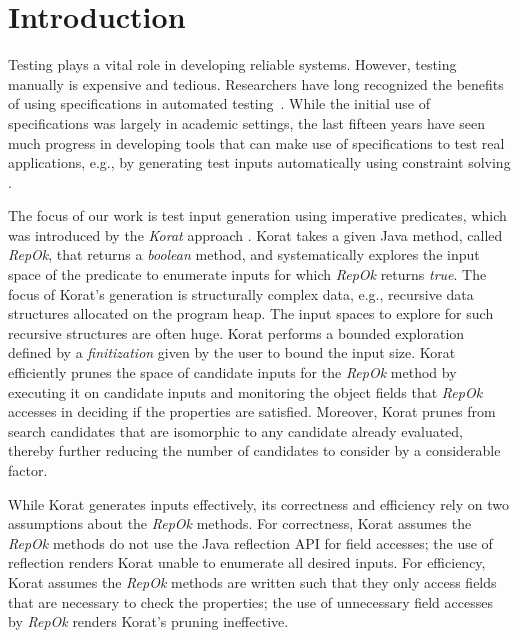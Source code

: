 \chapter{Introduction}
\label{ch:introduction}
Testing plays a vital role in developing reliable systems. However,
testing manually is expensive and tedious. Researchers have long
recognized the benefits of using specifications in automated
testing~\cite{boyapati2002korat,demilli1991constraint,gotlieb1998automatic,howden1977symbolic,huang1975approach,king1976symbolic,korel1996automated,marinov2001testera,khurshid2003generalized,sen2005cute,godefroid2005dart}. While
the initial use of specifications was largely in academic settings,
the last fifteen years have seen much progress in developing tools
that can make use of specifications to test real applications, e.g.,
by generating test inputs automatically using constraint solving
\cite{demilli1991constraint,gotlieb1998automatic,howden1977symbolic,huang1975approach,king1976symbolic,korel1996automated,legeard2002automated,marinov2001testera}.

\para The focus of our work is test input generation using imperative
predicates, which was introduced by the \emph{Korat} approach
\cite{boyapati2002korat}. Korat takes a given Java method, called
\emph{RepOk}, that returns a \emph{boolean} method, and systematically
explores the input space of the predicate to enumerate inputs for
which \emph{RepOk} returns \emph{true}. The focus of Korat’s
generation is structurally complex data, e.g., recursive data
structures allocated on the program heap. The input spaces to explore
for such recursive structures are often huge.  Korat performs a
bounded exploration defined by a \emph{finitization} given by the user
to bound the input size. Korat efficiently prunes the space of
candidate inputs for the \emph{RepOk} method by executing it on
candidate inputs and monitoring the object fields that \emph{RepOk}
accesses in deciding if the properties are satisfied. Moreover, Korat
prunes from search candidates that are isomorphic to any candidate
already evaluated, thereby further reducing the number of candidates
to consider by a considerable factor.

\para While Korat generates inputs effectively, its correctness and
efficiency rely on two assumptions about the \emph{RepOk} methods.
For correctness, Korat assumes the \emph{RepOk} methods do not use the
Java reflection API for field accesses; the use of reflection renders
Korat unable to enumerate all desired inputs.  For efficiency, Korat
assumes the \emph{RepOk} methods are written such that they only
access fields that are necessary to check the properties; the use of
unnecessary field accesses by \emph{RepOk} renders Korat's pruning
ineffective.


